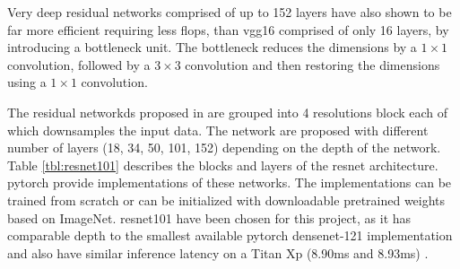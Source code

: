 Very deep residual networks comprised of up to 152 layers have also shown to be far more efficient requiring less \gls{flop}s, than \gls{vgg}16 comprised of only 16 layers, by introducing a bottleneck unit. The bottleneck reduces the dimensions by a $1 \times 1$ convolution, followed by a $3 \times 3$ convolution and then restoring the dimensions using a $1 \times 1$ convolution. 

The residual networkds proposed in \cite{he_deep_2015} are grouped into 4 resolutions block each of which downsamples the input data. The network are proposed with different number of layers (18, 34, 50, 101, 152) depending on the depth of the network. Table \ref{tbl:resnet101} describes the blocks and layers of the \gls{resnet} architecture. \gls{pytorch} provide implementations of these networks. The implementations can be trained from scratch or can be initialized with downloadable pretrained weights based on ImageNet. \gls{resnet}101 have been chosen for this project, as it has comparable depth to the smallest available \gls{pytorch} \gls{densenet}-121 implementation and also have similar inference latency on a Titan Xp (8.90ms and 8.93ms) \cite{bianco_benchmark_2018}.

